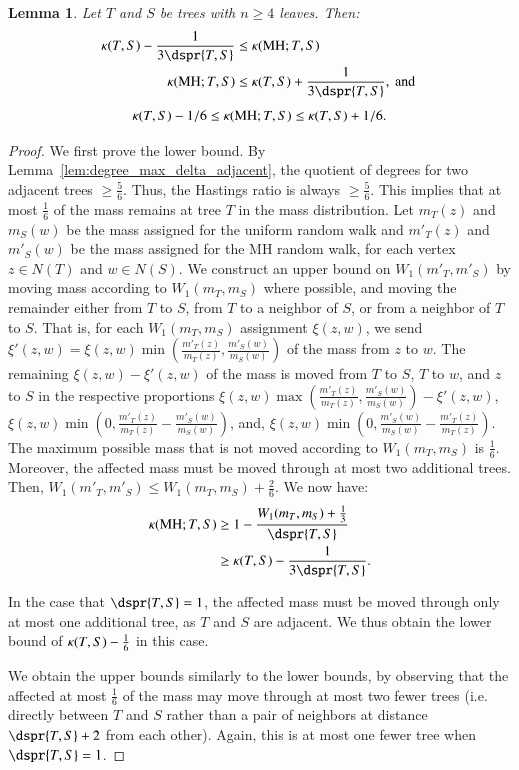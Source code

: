\documentclass[]{elsarticle}
\newtheorem{lem}[thm]{Lemma}
\newcommand{\MH}{\operatorname{MH}}
\newcommand{\curvature}[2][]{%
    \ifthenelse{\equal{#1}{}}%
		{\kappa(#2)}%
		{\kappa_{#1}(#2)}%
}
\begin{document}
\begin{lem}
	\label{lem:mh_curvature}
	Let $T$ and $S$ be trees with $n \ge 4$ leaves. Then:
	\begin{align*}
	\curvature{T,S} - \frac{1}{3\dspr{T,S}}
	&\le \curvature{\MH; T,S} \\
	\curvature{\MH; T,S}
	&\le \curvature{T,S} + \frac{1}{3\dspr{T,S}},\text{ and }
\end{align*}
	$$\curvature{T,S} - 1/6
	\le \curvature{\MH; T,S}
	\le \curvature{T,S} + 1/6 .$$
\end{lem}
\begin{proof}
	We first prove the lower bound.
	By Lemma~\ref{lem:degree_max_delta_adjacent}, the quotient of degrees for two adjacent trees $\ge \frac{5}{6}$.
	Thus, the Hastings ratio is always $\ge \frac{5}{6}$.
	This implies that at most $\frac{1}{6}$ of the mass remains at tree $T$ in the mass distribution.
	Let $m_T(z)$ and $m_S(w)$ be the mass assigned for the uniform random walk and $m'_T(z)$ and $m'_S(w)$ be the mass assigned for the MH random walk, for each vertex $z \in N(T)$ and $w \in N(S)$.
	We construct an upper bound on $W_1(m'_T,m'_S)$ by moving mass according to $W_1(m_T,m_S)$ where possible, and moving the remainder either from $T$ to $S$, from $T$ to a neighbor of $S$, or from a neighbor of $T$ to $S$.
	That is, for each $W_1(m_T,m_S)$ assignment $\xi(z,w)$, we send $\xi'(z,w) = \xi(z,w) \min\left(\frac{m'_T(z)}{m_T(z)}, \frac{m'_S(w)}{m_S(w)}\right)$ of the mass from $z$ to $w$.
	The remaining $\xi(z,w) - \xi'(z,w)$ of the mass is moved from $T$ to $S$, $T$ to $w$, and $z$ to $S$ in the respective proportions
	$\xi(z,w) \max\left(\frac{m'_T(z)}{m_T(z)}, \frac{m'_S(w)}{m_S(w)}\right) - \xi'(z,w)$,
	$\xi(z,w) \min\left(0, \frac{m'_T(z)}{m_T(z)} - \frac{m'_S(w)}{m_S(w)}\right)$, and,
	$\xi(z,w) \min\left(0, \frac{m'_S(w)}{m_S(w)} - \frac{m'_T(z)}{m_T(z)}\right)$.
	The maximum possible mass that is not moved according to $W_1(m_T,m_S)$ is $\frac{1}{6}$.
	Moreover, the affected mass must be moved through at most two additional trees.
	Then, $W_1(m'_T,m'_S) \le W_1(m_T,m_S) + \frac{2}{6}$.
	We now have:
	\begin{align*}
		\curvature{\MH; T,S} & \ge 1 - \frac{W_1(m_T,m_S) + \frac{1}{3}}{\dspr{T,S}} \\
		& \ge \curvature{T,S} - \frac{1}{3\dspr{T,S}}.
	\end{align*}

	In the case that $\dspr{T,S}=1$, the affected mass must be moved through only at most one additional tree, as $T$ and $S$ are adjacent.
	We thus obtain the lower bound of $\curvature{T,S} - \frac{1}{6}$ in this case.

	We obtain the upper bounds similarly to the lower bounds, by observing that the affected at most $\frac{1}{6}$ of the mass may move through at most two fewer trees (i.e. directly between $T$ and $S$ rather than a pair of neighbors at distance $\dspr{T,S} + 2$ from each other).
	Again, this is at most one fewer tree when $\dspr{T,S}=1$.
\end{proof}
\end{document}
